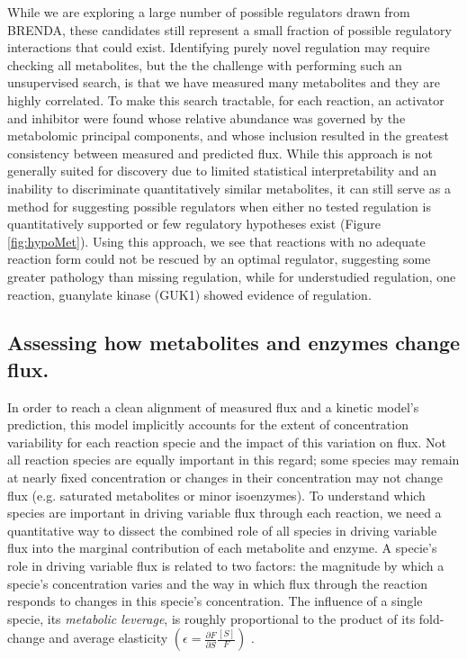 While we are exploring a large number of possible regulators drawn from BRENDA, these candidates still represent a small fraction of possible regulatory interactions that could exist. Identifying purely novel regulation may require checking all metabolites, but the the challenge with performing such an unsupervised search, is that we have measured many metabolites and they are highly correlated.  To make this search tractable, for each reaction, an activator and inhibitor were found whose relative abundance was governed by the metabolomic principal components, and whose inclusion resulted in the greatest consistency between measured and predicted flux.  While this approach is not generally suited for discovery due to limited statistical interpretability and an inability to discriminate quantitatively similar metabolites, it can still serve as a method for suggesting possible regulators when either no tested regulation is quantitatively supported or few regulatory hypotheses exist (Figure \ref{fig:hypoMet}).  Using this approach, we see that reactions with no adequate reaction form could not be rescued by an optimal regulator, suggesting some greater pathology than missing regulation, while for understudied regulation, one reaction, guanylate kinase (GUK1) showed evidence of regulation.

\subsection{Assessing how metabolites and enzymes change flux.}

In order to reach a clean alignment of measured flux and a kinetic model's prediction, this model implicitly accounts for the extent of concentration variability for each reaction specie and the impact of this variation on flux.  Not all reaction species are equally important in this regard; some species may remain at nearly fixed concentration or changes in their concentration may not change flux (e.g. saturated metabolites or minor isoenzymes).  To understand which species are important in driving variable flux through each reaction, we need a quantitative way to dissect the combined role of all species in driving variable flux into the marginal contribution of each metabolite and enzyme.  A specie's role in driving variable flux is related to two factors: the magnitude by which a specie's concentration varies and the way in which flux through the reaction responds to changes in this specie's concentration.  The influence of a single specie, its \textit{metabolic leverage}, is roughly proportional to the product of its fold-change and average elasticity $\left(\epsilon = \frac{\partial F}{\partial S}\frac{[S]}{F}\right)$ \cite{Kacser:1973fe, Liao:1993in}.

